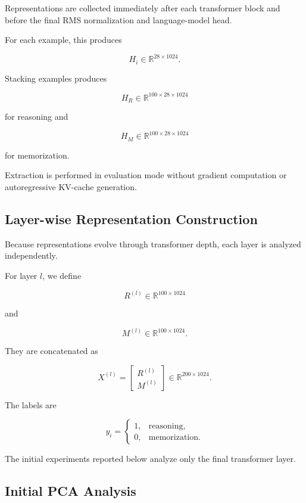 \documentclass[11pt]{article}
\begin{document}
Representations are collected immediately after each transformer
block and before the final RMS normalization and language-model head.

For each example, this produces

\[
H_i
\in
\mathbb{R}^{28 \times 1024}.
\]

Stacking examples produces

\[
H_R
\in
\mathbb{R}^{100 \times 28 \times 1024}
\]

for reasoning and

\[
H_M
\in
\mathbb{R}^{100 \times 28 \times 1024}
\]

for memorization.

Extraction is performed in evaluation mode without gradient
computation or autoregressive KV-cache generation.


\subsection{Layer-wise Representation Construction}

Because representations evolve through transformer depth, each layer
is analyzed independently.

For layer \(l\), we define

\[
R^{(l)}
\in
\mathbb{R}^{100 \times 1024}
\]

and

\[
M^{(l)}
\in
\mathbb{R}^{100 \times 1024}.
\]

They are concatenated as

\[
X^{(l)}
=
\begin{bmatrix}
R^{(l)} \\
M^{(l)}
\end{bmatrix}
\in
\mathbb{R}^{200 \times 1024}.
\]

The labels are

\[
y_i =
\begin{cases}
1, & \text{reasoning},\\
0, & \text{memorization}.
\end{cases}
\]

The initial experiments reported below analyze only the final
transformer layer.


\subsection{Initial PCA Analysis}
\end{document}
